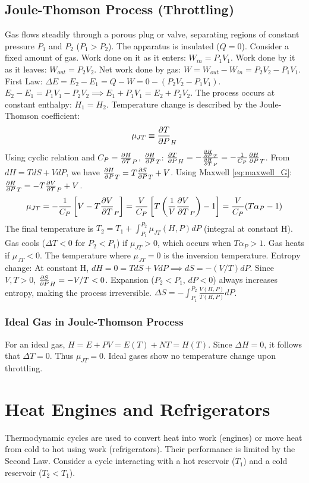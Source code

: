 \documentclass[10pt, letterpaper]{article}
\begin{document}
\subsection{Joule-Thomson Process (Throttling)}
Gas flows steadily through a porous plug or valve, separating regions of constant pressure $P_1$ and $P_2$ ($P_1 > P_2$). The apparatus is insulated ($Q=0$).
Consider a fixed amount of gas. Work done on it as it enters: $W_{in} = P_1 V_1$. Work done by it as it leaves: $W_{out} = P_2 V_2$. Net work done by gas: $W = W_{out} - W_{in} = P_2 V_2 - P_1 V_1$.
First Law: $\Delta E = E_2 - E_1 = Q - W = 0 - (P_2 V_2 - P_1 V_1)$.
$E_2 - E_1 = P_1 V_1 - P_2 V_2 \implies E_1 + P_1 V_1 = E_2 + P_2 V_2$.
The process occurs at constant enthalpy: $H_1 = H_2$.
Temperature change is described by the Joule-Thomson coefficient:
\begin{equation*}
    \mu_{JT} \equiv \pdv{T}{P}_{H}
\end{equation*}
Using cyclic relation and $C_P = \pdv{H}{T}_P$, $\pdv{H}{P}_T$:
$\pdv{T}{P}_{H} = - \frac{\pdv{H}{P}_{T}}{\pdv{H}{T}_{P}} = -\frac{1}{C_P} \pdv{H}{P}_{T}$.
From $dH = TdS + VdP$, we have $\pdv{H}{P}_T = T\pdv{S}{P}_T + V$. Using Maxwell \eqref{eq:maxwell_G}: $\pdv{H}{P}_T = -T\pdv{V}{T}_P + V$.
\begin{equation}
    \mu_{JT} = -\frac{1}{C_P} \left[ V - T\pdv{V}{T}_P \right] = \frac{V}{C_P} \left[ T \left(\frac{1}{V}\pdv{V}{T}_P\right) - 1 \right] = \frac{V}{C_P} (T \alpha_P - 1)
\end{equation}
The final temperature is $T_2 = T_1 + \int_{P_1}^{P_2} \mu_{JT}(H, P) dP$ (integral at constant H).
Gas cools ($\Delta T < 0$ for $P_2 < P_1$) if $\mu_{JT} > 0$, which occurs when $T \alpha_P > 1$. Gas heats if $\mu_{JT} < 0$. The temperature where $\mu_{JT}=0$ is the inversion temperature.
Entropy change: At constant H, $dH = 0 = TdS + VdP \implies dS = -(V/T) dP$.
Since $V, T > 0$, $\pdv{S}{P}_{H} = -V/T < 0$. Expansion ($P_2 < P_1$, $dP<0$) always increases entropy, making the process irreversible.
$\Delta S = -\int_{P_1}^{P_2} \frac{V(H, P)}{T(H, P)} dP$.

\subsubsection*{Ideal Gas in Joule-Thomson Process}
For an ideal gas, $H = E + PV = E(T) + N T = H(T)$. Since $\Delta H = 0$, it follows that $\Delta T = 0$. Thus $\mu_{JT} = 0$. Ideal gases show no temperature change upon throttling.

\section{Heat Engines and Refrigerators}
Thermodynamic cycles are used to convert heat into work (engines) or move heat from cold to hot using work (refrigerators). Their performance is limited by the Second Law. Consider a cycle interacting with a hot reservoir ($T_1$) and a cold reservoir ($T_2 < T_1$).
\end{document}
